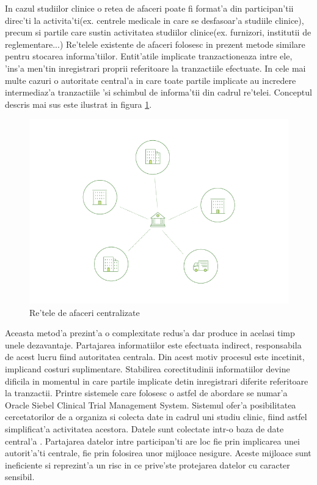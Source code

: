 \documentclass[12pt,a4paper,twoside]{report}
\begin{document}
	In cazul studiilor clinice o retea de afaceri poate fi format'a din participan'tii direc'ti la activita'ti(ex. centrele medicale in care se desfasoar'a studiile clinice), precum si partile care sustin activitatea studiilor clinice(ex. furnizori, institutii de reglementare...)
	Re'telele existente de afaceri folosesc in prezent metode similare pentru stocarea informa'tiilor. Entit'atile implicate tranzactioneaza intre ele, 'ins'a men'tin inregistrari proprii referitoare la tranzactiile efectuate. In cele mai multe cazuri o autoritate central'a in care toate partile implicate au incredere intermediaz'a tranzactiile 'si schimbul de informa'tii din cadrul re'telei. Conceptul descris mai sus este ilustrat in figura \ref{fig:centralised}.\\	
		\begin{figure}[!ht]
		\begin{center}
			\includegraphics[scale=1.60]{img/current_network.png}
			\caption{Re'tele de afaceri centralizate\cite{fabricdoc}}
  			\label{fig:centralised}
  		\end{center}
  		\end{figure}
  		
	Aceasta metod'a prezint'a o complexitate redus'a dar produce in acelasi timp unele dezavantaje. Partajarea informatiilor este efectuata indirect, responsabila de acest lucru fiind autoritatea centrala. Din acest motiv procesul este incetinit, implicand costuri suplimentare. Stabilirea corectitudinii informatiilor devine dificila in momentul in care partile implicate detin inregistrari diferite referitoare la tranzactii.
		Printre sistemele care folosesc o astfel de abordare se numar'a Oracle Siebel Clinical Trial Management System\cite{ctms}. Sistemul ofer'a posibilitatea cercetatorilor de a organiza si colecta date in cadrul uni studiu clinic, fiind astfel simplificat'a activitatea acestora. Datele sunt colectate intr-o baza de date central'a . Partajarea datelor intre participan'ti are loc fie prin implicarea unei autorit'a'ti centrale, fie prin folosirea unor mijloace nesigure. Aceste mijloace sunt ineficiente si reprezint'a un risc in ce prive'ste protejarea datelor cu caracter sensibil.\\	
\end{document}
